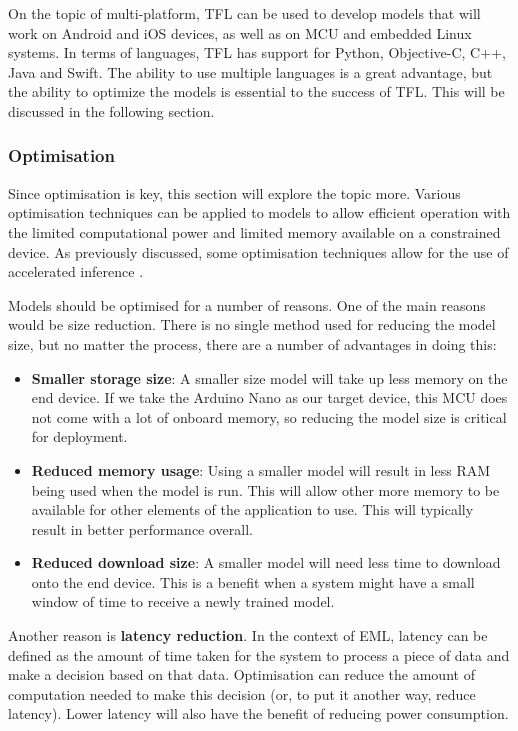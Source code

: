 \documentclass[conference]{IEEEtran}
\begin{document}
On the topic of multi-platform, TFL can be used to develop models that will work on Android and iOS devices, as well as on MCU and embedded Linux systems. In terms of languages, TFL has support for Python, Objective-C, C++, Java and Swift. The ability to use multiple languages is a great advantage, but the ability to optimize the models is essential to the success of TFL. This will be discussed in the following section.

\subsubsection{Optimisation} Since optimisation is key, this section will explore the topic more. Various optimisation techniques can be applied to models to allow efficient operation with the limited computational power and limited memory available on a constrained device. As previously discussed, some optimisation techniques allow for the use of accelerated inference \cite{b13}.

Models should be optimised for a number of reasons. One of the main reasons would be size reduction. There is no single method used for reducing the model size, but no matter the process, there are a number of advantages in doing this:

\begin{itemize}
    \item \textbf{Smaller storage size}: A smaller size model will take up less memory on the end device. If we take the Arduino Nano as our target device, this MCU does not come with a lot of onboard memory, so reducing the model size is critical for deployment.
    \item \textbf{Reduced memory usage}: Using a smaller model will result in less RAM being used when the model is run. This will allow other more memory to be available for other elements of the application to use. This will typically result in better performance overall.
    \item \textbf{Reduced download size}: A smaller model will need less time to download onto the end device. This is a benefit when a system might have a small window of time to receive a newly trained model.
\end{itemize}

Another reason is \textbf{latency reduction}. In the context of EML, latency can be defined as the amount of time taken for the system to process a piece of data and make a decision based on that data. Optimisation can reduce the amount of computation needed to make this decision (or, to put it another way, reduce latency). Lower latency will also have the benefit of reducing power consumption.
\end{document}
